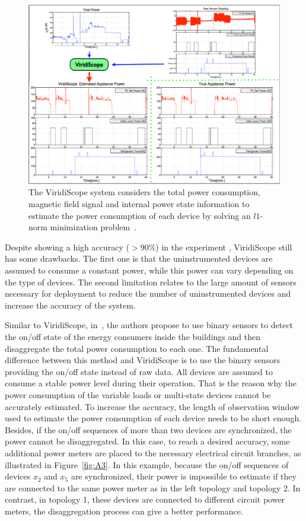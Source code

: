 \begin{figure}
\centering
\includegraphics[width=1\textwidth]{./chapters/chapter2/images/ViridiScope_extract.pdf} 
\caption{The ViridiScope system considers the total power consumption, magnetic field signal and internal power state information to estimate the power consumption of each device by solving an $l1$-norm minimization problem~\cite{Kim09Ubicomp}.} 
\label{fig:A2} 
\end{figure}

Despite showing a high accuracy ($>90\%$) in the experiment \cite{Kim09Ubicomp}, ViridiScope still has some drawbacks. The first one is that the uninstrumented devices are assumed to consume a constant power, while this power can vary depending on the type of devices. The second limitation relates to the large amount of sensors necessary for deployment to reduce the number of uninstrumented devices and increase the accuracy of the system. 

Similar to ViridiScope, in~\cite{Jung2010,Jung2014}, the authors propose to use binary sensors to detect the on/off state of the energy consumers inside the buildings and then disaggregate the total power consumption to each one. The fundamental difference between this method and ViridiScope is to use the binary sensors providing the on/off state instead of raw data. All devices are assumed to consume a stable power level during their operation. That is the reason why the power consumption of the variable loads or multi-state devices cannot be accurately estimated. To increase the accuracy, the length of observation window used to estimate the power consumption of each device needs to be short enough. Besides, if the on/off sequences of more than two devices are synchronized, the power cannot be disaggregated. In this case, to reach a desired accuracy, some additional power meters are placed to the necessary electrical circuit branches, as illustrated in Figure~\ref{fig:A3}. In this example, because the on/off sequences of devices $x_2$ and $x_5$ are synchronized, their power is impossible to estimate if they are connected to the same power meter as in the left topology and topology 2. In contrast, in topology 1, these devices are connected to different circuit power meters, the disaggregation process can give a better performance. 

